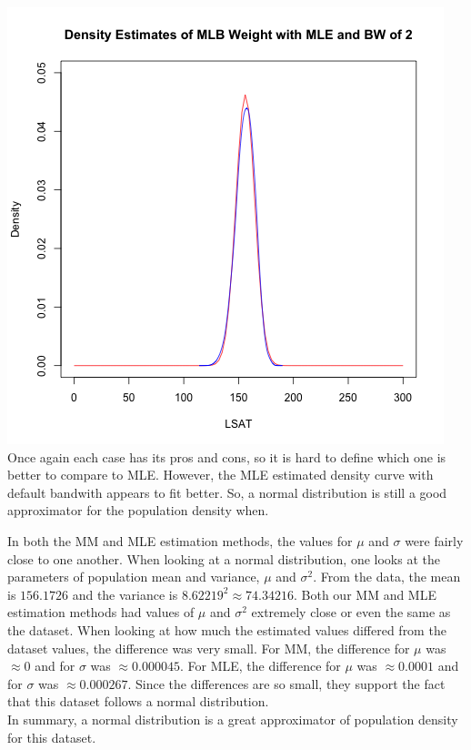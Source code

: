 \documentclass[12pt, letterpaper]{article}
\begin{document}
\includegraphics[scale=0.85]{Lawschool_LSAT_Density_mlebw} \\
Once again each case has its pros and cons, so it is hard to define which one is better to compare to MLE. However, the MLE estimated density curve with default bandwith appears to fit better. So, a normal distribution is still a good approximator for the population density when. 

\newpage
\noindent
In both the MM and MLE estimation methods, the values for $\mu$ and $\sigma$ were fairly close to one another. When looking at a normal distribution, one looks at the parameters of population mean and variance, $\mu$ and $\sigma^2$. From the data, the mean is $156.1726$ and the variance is $ 8.62219^2 \approx 74.34216$. Both our MM and MLE estimation methods had values of $\mu$ and $\sigma^2$ extremely close or even the same as the dataset. When looking at how much the estimated values differed from the dataset values, the difference was very small. For MM, the difference for $\mu$ was $\approx 0$ and for $\sigma$ was $\approx 0.000045$. For MLE, the difference for $\mu$ was $\approx 0.0001$ and for $\sigma$ was $\approx 0.000267$. Since the differences are so small, they support the fact that this dataset follows a normal distribution. \\
In summary, a normal distribution is a great approximator of population density for this dataset.  
\end{document}
